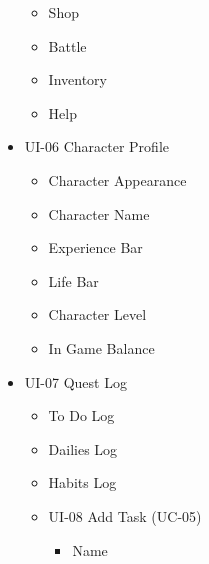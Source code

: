 \documentclass[12pt]{report}
\renewcommand{\_}{\kern-1.5pt\textunderscore\kern-1.5pt}
\begin{document}
\begin{itemize}
\begin{itemize}
	\item Shop\par

	\item Battle\par

	\item Inventory\par

	\item Help\par


\end{itemize}
	\item UI-06 Character Profile\par

\begin{itemize}
	\item Character Appearance\par

	\item Character Name\par

	\item Experience Bar\par

	\item Life Bar\par

	\item Character Level\par

	\item In Game Balance\par

\newpage
\end{itemize}
	\item UI-07 Quest Log\par

\begin{itemize}
	\item To Do Log\par

	\item Dailies Log\par

	\item Habits Log\par

	\item UI-08 Add Task (UC-05)\par

\begin{itemize}
	\item Name\par


\end{itemize}
\end{itemize}
\end{itemize}
\end{document}
